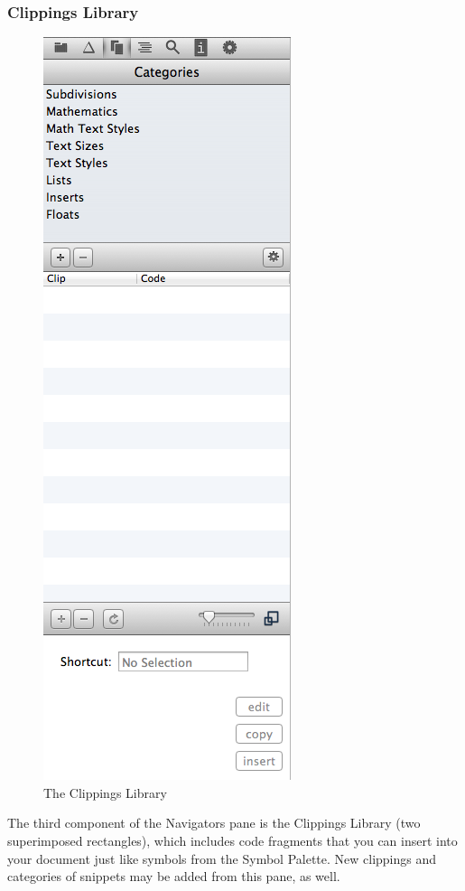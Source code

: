 \pagebreak
\subsubsection{Clippings Library}
\begin{figure}
\includegraphics[height=0.8\textheight, clip=true]{TeXnicle-Images/texnicle-nav-cliplib.png}
\caption{The Clippings Library}
\label{fig:texnicle-nav-cliplib}
\end{figure}
The third component of the Navigators pane is the Clippings Library (two superimposed rectangles), which includes code fragments that you can insert into your document just like symbols from the Symbol Palette. New clippings and categories of snippets may be added from this pane, as well.

